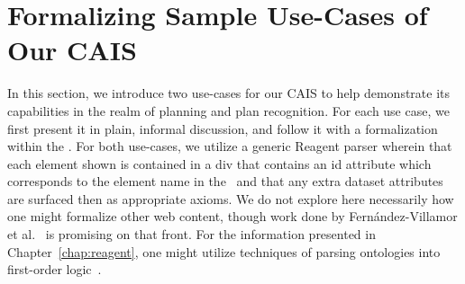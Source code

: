 \section{Formalizing Sample Use-Cases of Our CAIS}\label{chap:use_cases}

In this section, we introduce two use-cases for our CAIS to help demonstrate
its capabilities in the realm of planning and plan recognition. For each
use case, we first present it in plain, informal discussion, and follow it
with a formalization within the \CEC. For both use-cases, we utilize a generic
Reagent parser wherein that each element shown is contained in a div that
contains an id attribute which corresponds to the element name in the \CEC\
and that any extra dataset attributes are surfaced then as appropriate axioms.
We do not explore here necessarily how one might formalize other web content,
though work done by Fern{\'a}ndez-Villamor et 
al.~\cite{fernandez-villamor_firstorder_2012} is promising on that front. For
the information presented in Chapter~\ref{chap:reagent}, one might utilize
techniques of parsing ontologies into first-order logic~\cite{pease_english_2003}.




